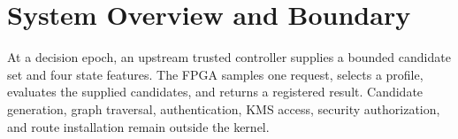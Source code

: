 \section{System Overview and Boundary}

At a decision epoch, an upstream trusted controller supplies a bounded candidate
set and four state features. The FPGA samples one request, selects a profile,
evaluates the supplied candidates, and returns a registered result. Candidate
generation, graph traversal, authentication, KMS access, security authorization,
and route installation remain outside the kernel.





